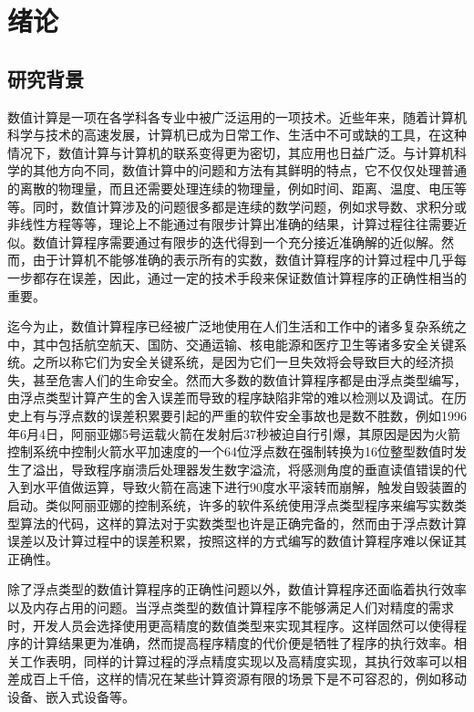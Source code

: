 \chapter{绪论}\label{chapter_introduction}

\section{研究背景}

数值计算\cite{rburden81:numerical}是一项在各学科各专业中被广泛运用的一项技术。近些年来，随着计算机科学与技术的高速发展，计算机已成为日常工作、生活中不可或缺的工具，在这种情况下，数值计算与计算机的联系变得更为密切，其应用也日益广泛。与计算机科学的其他方向不同，数值计算中的问题和方法有其鲜明的特点，它不仅仅处理普通的离散的物理量，而且还需要处理连续的物理量，例如时间、距离、温度、电压等等。同时，数值计算涉及的问题很多都是连续的数学问题，例如求导数、求积分或非线性方程等等，理论上不能通过有限步计算出准确的结果，计算过程往往需要近似。数值计算程序需要通过有限步的迭代得到一个充分接近准确解的近似解。然而，由于计算机不能够准确的表示所有的实数，数值计算程序的计算过程中几乎每一步都存在误差，因此，通过一定的技术手段来保证数值计算程序的正确性相当的重要。

迄今为止，数值计算程序已经被广泛地使用在人们生活和工作中的诸多复杂系统之中，其中包括航空航天、国防、交通运输、核电能源和医疗卫生等诸多安全关键系统。之所以称它们为安全关键系统，是因为它们一旦失效将会导致巨大的经济损失，甚至危害人们的生命安全。然而大多数的数值计算程序都是由浮点类型编写，由浮点类型计算产生的舍入误差而导致的程序缺陷非常的难以检测以及调试。在历史上有与浮点数的误差积累要引起的严重的软件安全事故也是数不胜数，例如1996年6月4日，阿丽亚娜5号运载火箭在发射后37秒被迫自行引爆\cite{lions1996ariane}，其原因是因为火箭控制系统中控制火箭水平加速度的一个64位浮点数在强制转换为16位整型数值时发生了溢出，导致程序崩溃后处理器发生数字溢流，将感测角度的垂直读值错误的代入到水平值做运算，导致火箭在高速下进行90度水平滚转而崩解，触发自毁装置的启动。类似阿丽亚娜的控制系统，许多的软件系统使用浮点类型程序来编写实数类型算法的代码，这样的算法对于实数类型也许是正确完备的，然而由于浮点数计算误差以及计算过程中的误差积累，按照这样的方式编写的数值计算程序难以保证其正确性。

除了浮点类型的数值计算程序的正确性问题以外，数值计算程序还面临着执行效率以及内存占用的问题。当浮点类型的数值计算程序不能够满足人们对精度的需求时，开发人员会选择使用更高精度的数值类型来实现其程序。这样固然可以使得程序的计算结果更为准确，然而提高程序精度的代价便是牺牲了程序的执行效率。相关工作表明，同样的计算过程的浮点精度实现以及高精度实现，其执行效率可以相差成百上千倍，这样的情况在某些计算资源有限的场景下是不可容忍的，例如移动设备、嵌入式设备等。

